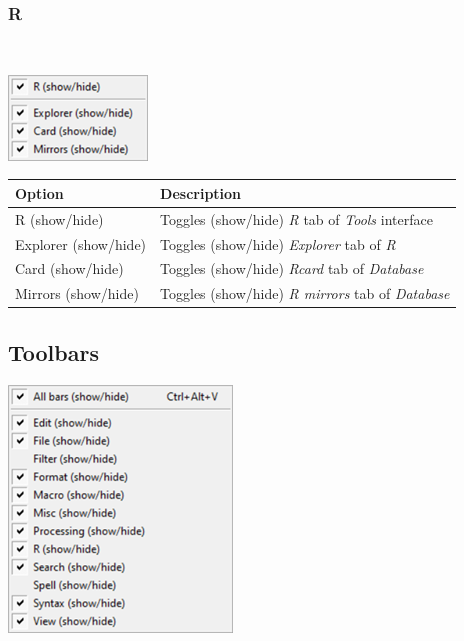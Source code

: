 \hypertarget{menu_view_tools_resources_r}{}
\subsubsection{R}\\

\includegraphics[scale=0.50]{./res/menu_view_tools_resources_r.png}\\

\begin{scriptsize}
  \begin{tabularx}{\textwidth}{>{\hsize=0.3\hsize}X>{\hsize=0.7\hsize}X}\\
    \hline
    \textbf{Option} & \textbf{Description} \\
    \hline
    R (show/hide) & Toggles (show/hide) \textit{R} tab of \textit{Tools} interface \\
    Explorer (show/hide) & Toggles (show/hide) \textit{Explorer} tab of \textit{R} \\
    Card (show/hide) & Toggles (show/hide) \textit{Rcard} tab of \textit{Database} \\
    Mirrors (show/hide) & Toggles (show/hide) \textit{R mirrors} tab of \textit{Database} \\
    \hline
  \end{tabularx}
\end{scriptsize}


\hypertarget{menu_view_toolbars}{}
\subsection{Toolbars}

\includegraphics[scale=0.50]{./res/menu_view_toolsbar.png}\\

